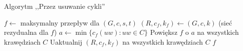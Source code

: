 \begin{algorithm}[H]
	\caption{Algorytm ,,Przez usuwanie cykli''}
	\begin{algorithmic}[1]
		\State $f \gets $ maksymalny przepływ dla $(G,c,s,t)$
		\State $(R,c_f,k_f) \gets (G,c,k)$ (sieć rezydualna dla $f$)
		\State $a \gets \min\{c_f(uw) : uw \in C\}$
		\State Powiększ $f$ o $a$ na wszystkich krawędziach $C$
		\State Uaktualnij $(R, c_f, k_f)$ na wszystkich krawędziach $C$
		\EndWhile 
		\State \Return $f$
		\EndProcedure
	\end{algorithmic}
	\label{zad45}
\end{algorithm}
